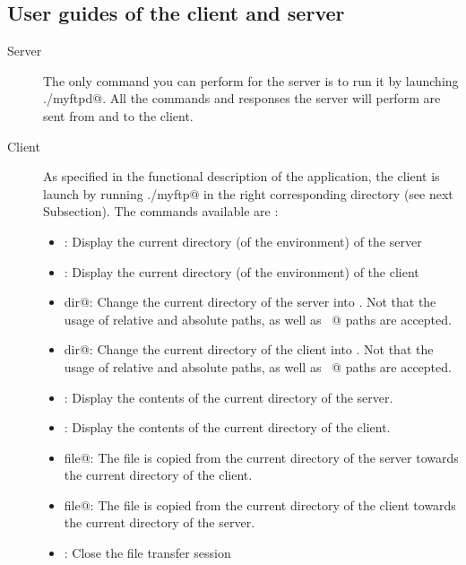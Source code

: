 \documentclass{article}
\begin{document}
\subsection{User guides of the client and server}
\begin{description}
\item[Server] The only command you can perform for the server is to run it by launching \verb@./myftpd@. All the commands and responses the server will perform are sent from and to the client.
\item[Client] As specified in the functional description of the application, the client is launch by running \verb@./myftp@ in the right corresponding directory (see next Subsection). The commands available are :
\begin{itemize}
\item \verb@pwd@: Display the current directory (of the environment) of the server
\item \verb@lpwd@: Display the current directory (of the environment) of the client
\item \verb@cd dir@: Change the current directory of the server into \verb@dir@. Not that the usage of relative and absolute paths, as well as \verb@~@ paths  are accepted.
\item \verb@lcd dir@: Change the current directory of the client into \verb@dir@. Not that the usage of relative and absolute paths, as well as \verb@~@ paths  are accepted.
\item \verb@ls@: Display the contents of the current directory of the server.
\item \verb@lls@: Display the contents of the current directory of the client.
\item \verb@get file@: The file \verb@file@ is copied from the current directory of the server towards the current directory of the client.
\item \verb@put file@: The file \verb@file@ is copied from the current directory of the client towards the current directory of the server.
\item \verb@bye@: Close the file transfer session
\end{itemize}
\end{description}
\end{document}
